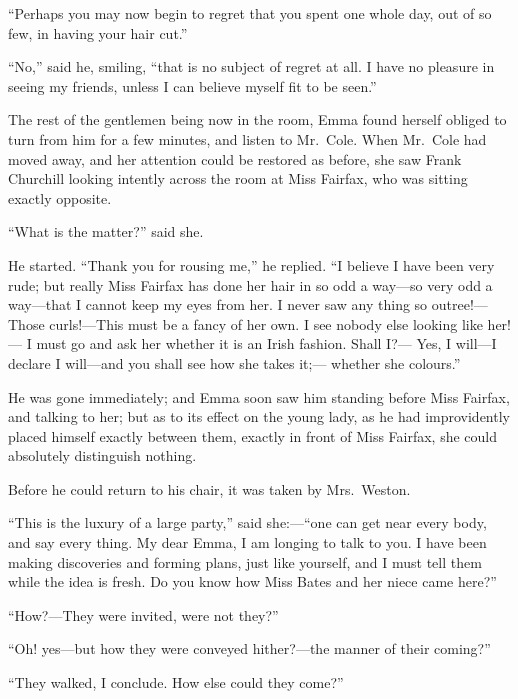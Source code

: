 ``Perhaps you may now begin to regret that you spent one whole day,
out of so few, in having your hair cut.''

``No,'' said he, smiling, ``that is no subject of regret at all.
I have no pleasure in seeing my friends, unless I can believe myself
fit to be seen.''

The rest of the gentlemen being now in the room, Emma found herself
obliged to turn from him for a few minutes, and listen to Mr.\ Cole.
When Mr.\ Cole had moved away, and her attention could be restored
as before, she saw Frank Churchill looking intently across the room
at Miss Fairfax, who was sitting exactly opposite.

``What is the matter?'' said she.

He started.  ``Thank you for rousing me,'' he replied.  ``I believe
I have been very rude; but really Miss Fairfax has done her hair
in so odd a way---so very odd a way---that I cannot keep my eyes
from her.  I never saw any thing so outree!---Those curls!---This must
be a fancy of her own.  I see nobody else looking like her!---%
I must go and ask her whether it is an Irish fashion.  Shall I?---%
Yes, I will---I declare I will---and you shall see how she takes it;---%
whether she colours.''

He was gone immediately; and Emma soon saw him standing before Miss
Fairfax, and talking to her; but as to its effect on the young lady,
as he had improvidently placed himself exactly between them, exactly
in front of Miss Fairfax, she could absolutely distinguish nothing.

Before he could return to his chair, it was taken by Mrs.\ Weston.

``This is the luxury of a large party,'' said she:---``one can get
near every body, and say every thing.  My dear Emma, I am longing
to talk to you.  I have been making discoveries and forming plans,
just like yourself, and I must tell them while the idea is fresh.
Do you know how Miss Bates and her niece came here?''

``How?---They were invited, were not they?''

``Oh! yes---but how they were conveyed hither?---the manner of their coming?''

``They walked, I conclude.  How else could they come?''

